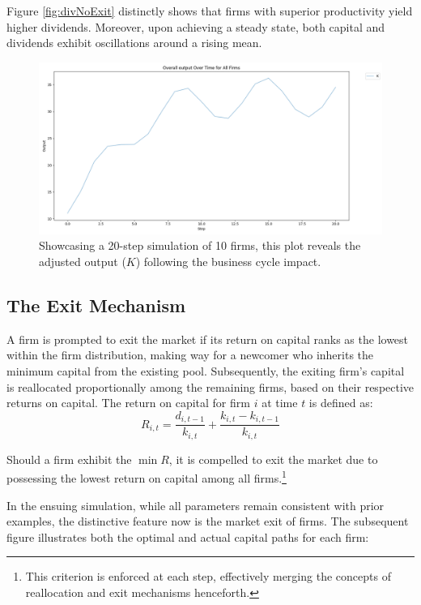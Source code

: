 \documentclass[12pt]{report}
\begin{document}
Figure \ref{fig:divNoExit} distinctly shows that firms with superior productivity yield higher dividends. Moreover, upon
achieving a steady state, both capital and dividends exhibit oscillations around a rising mean. 
\begin{figure}[H]
    \centering
    \includegraphics[scale=0.4]{figure/Output_noexit.png}
    \caption{Showcasing a 20-step simulation of 10 firms, this plot reveals the adjusted output (\( K \)) following the business cycle impact.}
    \label{fig:OutNoExit}
\end{figure}


\subsection{The Exit Mechanism}

A firm is prompted to exit the market if its return on capital ranks as the lowest within the firm distribution, making
way for a newcomer who inherits the minimum capital from the existing pool. Subsequently, the exiting firm's capital is
reallocated proportionally among the remaining firms, based on their respective returns on capital. The return on
capital for firm \( i \) at time \( t \) is defined as: 
\begin{equation}
    R_{i,t} = \frac{d_{i,t-1}}{k_{i,t}} + \frac{k_{i,t}-k_{i,t-1}}{k_{i,t}} 
\end{equation}


Should a firm exhibit the \( \min{R} \), it is compelled to exit the market due to possessing the lowest return on capital
among all firms.\footnote{This criterion is enforced at each step, effectively merging the concepts of reallocation and
exit mechanisms henceforth.} 

In the ensuing simulation, while all parameters remain consistent with prior examples, the distinctive feature now is
the market exit of firms. The subsequent figure illustrates both the optimal and actual capital paths for each firm: 
\end{document}
